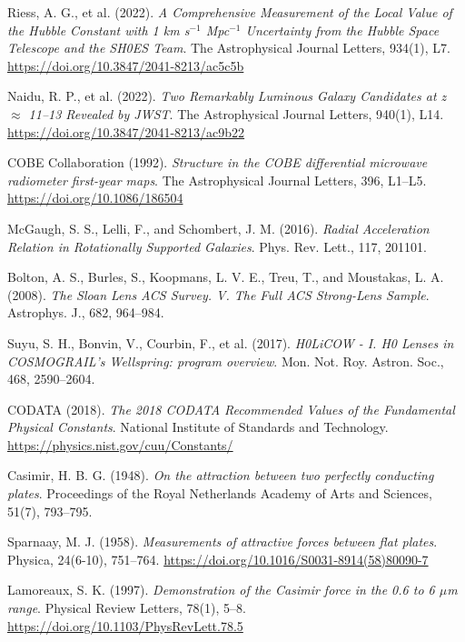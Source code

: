 \documentclass[12pt,a4paper]{article}
\theoremstyle{definition}
\begin{document}
\begin{thebibliography}{99}
		Riess, A. G., et al. (2022). 
		\textit{A Comprehensive Measurement of the Local Value of the Hubble Constant with 1 km s$^{-1}$ Mpc$^{-1}$ Uncertainty from the Hubble Space Telescope and the SH0ES Team}. 
		The Astrophysical Journal Letters, 934(1), L7. 
		\url{https://doi.org/10.3847/2041-8213/ac5c5b}
		
		Naidu, R. P., et al. (2022). 
		\textit{Two Remarkably Luminous Galaxy Candidates at z $\approx$ 11--13 Revealed by JWST}. 
		The Astrophysical Journal Letters, 940(1), L14. 
		\url{https://doi.org/10.3847/2041-8213/ac9b22}
		
		COBE Collaboration (1992). 
		\textit{Structure in the COBE differential microwave radiometer first-year maps}. 
		The Astrophysical Journal Letters, 396, L1--L5. 
		\url{https://doi.org/10.1086/186504}
		
		McGaugh, S. S., Lelli, F., and Schombert, J. M. (2016). 
		\textit{Radial Acceleration Relation in Rotationally Supported Galaxies}. 
		Phys. Rev. Lett., 117, 201101.
		
		Bolton, A. S., Burles, S., Koopmans, L. V. E., Treu, T., and Moustakas, L. A. (2008). 
		\textit{The Sloan Lens ACS Survey. V. The Full ACS Strong-Lens Sample}. 
		Astrophys. J., 682, 964--984.
		
		Suyu, S. H., Bonvin, V., Courbin, F., et al. (2017). 
		\textit{H0LiCOW - I. H0 Lenses in COSMOGRAIL's Wellspring: program overview}. 
		Mon. Not. Roy. Astron. Soc., 468, 2590--2604.
		
		CODATA (2018). 
		\textit{The 2018 CODATA Recommended Values of the Fundamental Physical Constants}. 
		National Institute of Standards and Technology. 
		\url{https://physics.nist.gov/cuu/Constants/}
		
		Casimir, H. B. G. (1948). 
		\textit{On the attraction between two perfectly conducting plates}. 
		Proceedings of the Royal Netherlands Academy of Arts and Sciences, 51(7), 793--795.
		
		Sparnaay, M. J. (1958). 
		\textit{Measurements of attractive forces between flat plates}. 
		Physica, 24(6-10), 751--764. 
		\url{https://doi.org/10.1016/S0031-8914(58)80090-7}
		
		Lamoreaux, S. K. (1997). 
		\textit{Demonstration of the Casimir force in the 0.6 to 6 $\mu$m range}. 
		Physical Review Letters, 78(1), 5--8. 
		\url{https://doi.org/10.1103/PhysRevLett.78.5}
		

\end{thebibliography}
\end{document}
